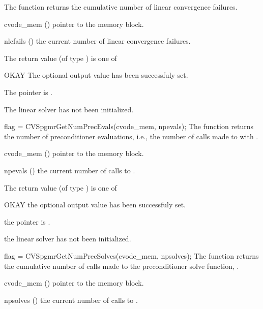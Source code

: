 {
  The function  returns the
  cumulative number of linear convergence failures.
}
{
  \begin{args}
  \item[cvode\_mem] ()
    pointer to the {\cvodes} memory block.
  \item[nlcfails] ()
    the current number of linear convergence failures.
  \end{args}
}
{
  The return value  (of type ) is one of
  \begin{args}
  \item[OKAY] 
    The optional output value has been successfuly set.
  \item[\Id{LIN\_NO\_MEM}]
    The  pointer is .
  \item[\Id{LIN\_NO\_LMEM}]
    The {\cvspgmr} linear solver has not been initialized.
  \end{args}
}
{}
{
  flag = CVSpgmrGetNumPrecEvals(cvode\_mem, npevals);
}
{
  The function  returns the
  number of preconditioner evaluations, i.e., the number of 
  calls made to  with .
}
{
  \begin{args}
  \item[cvode\_mem] ()
    pointer to the {\cvodes} memory block.
  \item[npevals] ()
    the current number of calls to .
  \end{args}
}
{
  The return value  (of type ) is one of
  \begin{args}
  \item[OKAY] 
    the optional output value has been successfuly set.
  \item[\Id{LIN\_NO\_MEM}]
    the  pointer is .
  \item[\Id{LIN\_NO\_LMEM}]
    the {\cvspgmr} linear solver has not been initialized.
  \end{args}
}
{}
{
  flag = CVSpgmrGetNumPrecSolves(cvode\_mem, npsolves);
}
{
  The function  returns the
  cumulative number of calls made to the preconditioner 
  solve function, .
}
{
  \begin{args}
  \item[cvode\_mem] ()
    pointer to the {\cvodes} memory block.
  \item[npsolves] ()
    the current number of calls to .
  \end{args}
}
